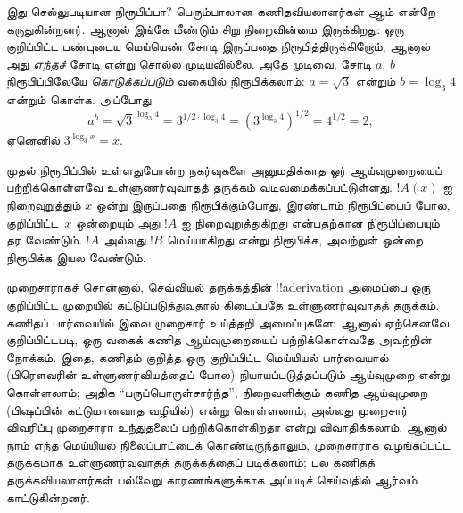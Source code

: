 \documentclass[../../../include/open-logic-chapter]{subfiles}
\begin{document}
இது செல்லுபடியான நிரூபிப்பா? பெரும்பாலான கணிதவியலாளர்கள் ஆம் என்றே
கருதுகின்றனர். ஆனால் இங்கே மீண்டும் சிறு நிறைவின்மை இருக்கிறது: ஒரு
குறிப்பிட்ட பண்புடைய மெய்யெண் சோடி இருப்பதை நிரூபித்திருக்கிறோம்; ஆனால் அது
\emph{எந்தச்} சோடி என்று சொல்ல முடியவில்லை. அதே முடிவை, சோடி $a$, $b$
நிரூபிப்பிலேயே \emph{கொடுக்கப்படும்} வகையில் நிரூபிக்கலாம்: $a = \sqrt{3}$
என்றும் $b = \log_3 4$ என்றும் கொள்க. அப்போது
\[
a^b = \sqrt{3}^{\log_3 4} = 3^{1/2 \cdot \log_3 4} = (3^{\log_3
  4})^{1/2} = 4^{1/2}= 2,
\]
ஏனெனில் $3^{\log_3 x} = x$.

முதல் நிரூபிப்பில் உள்ளதுபோன்ற நகர்வுகளை அனுமதிக்காத ஓர் ஆய்வுமுறையைப்
பற்றிக்கொள்ளவே உள்ளுணர்வுவாதத் தருக்கம் வடிவமைக்கப்பட்டுள்ளது. $!A(x)$ ஐ
நிறைவுறுத்தும் $x$ ஒன்று இருப்பதை நிரூபிக்கும்போது, இரண்டாம் நிரூபிப்பைப்
போல, குறிப்பிட்ட~$x$ ஒன்றையும் அது $!A$ ஐ நிறைவுறுத்துகிறது என்பதற்கான
நிரூபிப்பையும் தர வேண்டும். $!A$ அல்லது $!B$ மெய்யாகிறது என்று நிரூபிக்க,
அவற்றுள் ஒன்றை நிரூபிக்க இயல வேண்டும்.

முறைசாராகச் சொன்னால், செவ்வியல் தருக்கத்தின் !!a{derivation} அமைப்பை ஒரு
குறிப்பிட்ட முறையில் கட்டுப்படுத்துவதால் கிடைப்பதே உள்ளுணர்வுவாதத் தருக்கம்.
கணிதப் பார்வையில் இவை முறைசார் உய்த்தறி அமைப்புகளே; ஆனால் ஏற்கெனவே
குறிப்பிட்டபடி, ஒரு வகைக் கணித ஆய்வுமுறையைப் பற்றிக்கொள்வதே அவற்றின்
நோக்கம். இதை, கணிதம் குறித்த ஒரு குறிப்பிட்ட மெய்யியல் பார்வையால்
(பிரௌவரின் உள்ளுணர்வியத்தைப் போல) நியாயப்படுத்தப்படும் ஆய்வுமுறை என்று
கொள்ளலாம்; அதிக ``பருப்பொருள்சார்ந்த'', நிறைவளிக்கும் கணித ஆய்வுமுறை
(பிஷப்பின் கட்டுமானவாத வழியில்) என்று கொள்ளலாம்; அல்லது முறைசார் விவரிப்பு
முறைசாரா உந்துதலைப் பற்றிக்கொள்கிறதா என்று விவாதிக்கலாம். ஆனால் நாம் எந்த
மெய்யியல் நிலைப்பாட்டைக் கொண்டிருந்தாலும், முறைசாராக வழங்கப்பட்ட தருக்கமாக
உள்ளுணர்வுவாதத் தருக்கத்தைப் படிக்கலாம்; பல கணிதத் தருக்கவியலாளர்கள்
பல்வேறு காரணங்களுக்காக அப்படிச் செய்வதில் ஆர்வம் காட்டுகின்றனர்.
\end{document}
